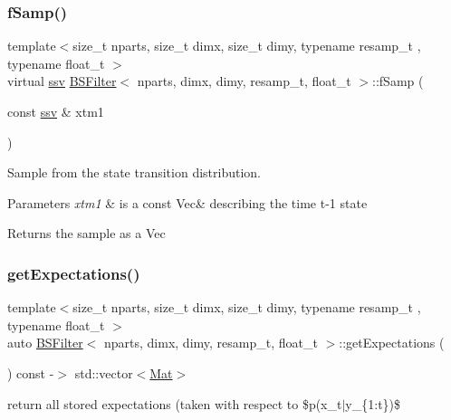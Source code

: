 \subsubsection{\texorpdfstring{f\+Samp()}{fSamp()}}
{\footnotesize\ttfamily template$<$size\+\_\+t nparts, size\+\_\+t dimx, size\+\_\+t dimy, typename resamp\+\_\+t , typename float\+\_\+t $>$ \\
virtual \hyperlink{classBSFilter_a0b5bc93957fb6b6b1282f31fa2e01c3c}{ssv} \hyperlink{classBSFilter}{B\+S\+Filter}$<$ nparts, dimx, dimy, resamp\+\_\+t, float\+\_\+t $>$\+::f\+Samp (\begin{DoxyParamCaption}\item[{const \hyperlink{classBSFilter_a0b5bc93957fb6b6b1282f31fa2e01c3c}{ssv} \&}]{xtm1 }\end{DoxyParamCaption})\hspace{0.3cm}{\ttfamily [pure virtual]}}



Sample from the state transition distribution. 


\begin{DoxyParams}{Parameters}
{\em xtm1} & is a const Vec\& describing the time t-\/1 state \\
\hline
\end{DoxyParams}
\begin{DoxyReturn}{Returns}
the sample as a Vec 
\end{DoxyReturn}
\mbox{\label{classBSFilter_af0750c5880c1e5254cfd18157a623915}} 
\subsubsection{\texorpdfstring{get\+Expectations()}{getExpectations()}}
{\footnotesize\ttfamily template$<$size\+\_\+t nparts, size\+\_\+t dimx, size\+\_\+t dimy, typename resamp\+\_\+t , typename float\+\_\+t $>$ \\
auto \hyperlink{classBSFilter}{B\+S\+Filter}$<$ nparts, dimx, dimy, resamp\+\_\+t, float\+\_\+t $>$\+::get\+Expectations (\begin{DoxyParamCaption}{ }\end{DoxyParamCaption}) const -\/$>$ std\+::vector$<$\hyperlink{classBSFilter_a8ec8e8477e12686e706e7d7aa5c2971c}{Mat}$>$}



return all stored expectations (taken with respect to \$p(x\+\_\+t$\vert$y\+\_\+\{1\+:t\})\$ 

